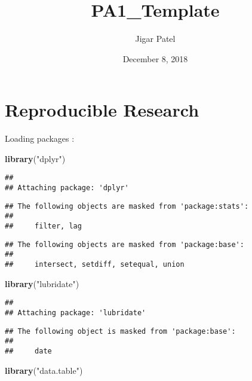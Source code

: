 \documentclass[]{article}
\title{PA1\_Template}
\author{Jigar Patel}
\date{December 8, 2018}
\newenvironment{Shaded}{\begin{snugshade}}{\end{snugshade}}
\newcommand{\KeywordTok}[1]{\textcolor[rgb]{0.13,0.29,0.53}{\textbf{#1}}}
\newcommand{\StringTok}[1]{\textcolor[rgb]{0.31,0.60,0.02}{#1}}
\newcommand{\NormalTok}[1]{#1}
\begin{document}
\maketitle

\section{Reproducible Research}\label{reproducible-research}

Loading packages :

\begin{Shaded}
\begin{Highlighting}[]
  \KeywordTok{library}\NormalTok{(}\StringTok{"dplyr"}\NormalTok{)}
\end{Highlighting}
\end{Shaded}

\begin{verbatim}
## 
## Attaching package: 'dplyr'
\end{verbatim}

\begin{verbatim}
## The following objects are masked from 'package:stats':
## 
##     filter, lag
\end{verbatim}

\begin{verbatim}
## The following objects are masked from 'package:base':
## 
##     intersect, setdiff, setequal, union
\end{verbatim}

\begin{Shaded}
\begin{Highlighting}[]
  \KeywordTok{library}\NormalTok{(}\StringTok{"lubridate"}\NormalTok{)}
\end{Highlighting}
\end{Shaded}

\begin{verbatim}
## 
## Attaching package: 'lubridate'
\end{verbatim}

\begin{verbatim}
## The following object is masked from 'package:base':
## 
##     date
\end{verbatim}

\begin{Shaded}
\begin{Highlighting}[]
  \KeywordTok{library}\NormalTok{(}\StringTok{"data.table"}\NormalTok{)}
\end{Highlighting}
\end{Shaded}
\end{document}
